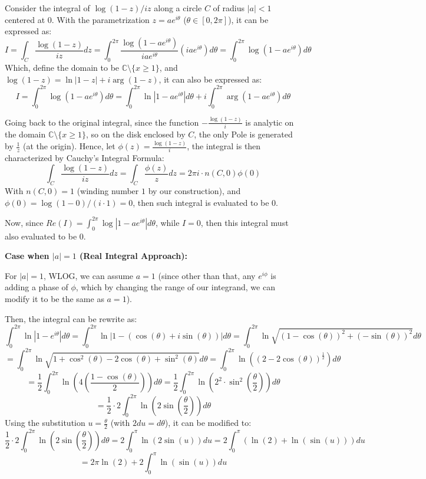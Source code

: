 \documentclass{article}
\begin{document}
\hfil

Consider the integral of $\log(1-z)/iz$ along a circle $C$ of radius $|a|<1$ centered at $0$. With the parametrization $z=ae^{i\theta}$ ($\theta\in [0,2\pi]$), it can be expressed as:
$$I=\int_{C}\frac{\log(1-z)}{iz}dz = \int_{0}^{2\pi}\frac{\log(1-ae^{i\theta})}{iae^{i\theta}}(iae^{i\theta})d\theta = \int_{0}^{2\pi}\log(1-ae^{i\theta})d\theta$$
Which, define the domain to be $\mathbb{C}\setminus\{x\geq 1\}$, and $\log(1-z)=\ln|1-z|+i\arg(1-z)$, it can also be expressed as:
$$I= \int_{0}^{2\pi}\log(1-ae^{i\theta})d\theta=\int_{0}^{2\pi}\ln|1-ae^{i\theta}|d\theta + i\int_{0}^{2\pi}\arg(1-ae^{i\theta})d\theta$$

Going back to the original integral, since the function $-\frac{\log(1-z)}{i}$ is analytic on the domain $\mathbb{C}\setminus\{x\geq 1\}$, so on the disk enclosed by $C$, the only Pole 
is generated by $\frac{1}{z}$ (at the origin). Hence, let $\phi(z)=\frac{\log(1-z)}{i}$, the integral is then characterized by Cauchy's Integral Formula:
$$\int_{C}\frac{\log(1-z)}{iz}dz = \int_{C}\frac{\phi(z)}{z}dz = 2\pi i\cdot n(C,0)\phi(0)$$
With $n(C,0)=1$ (winding number $1$ by our construction), and $\phi(0)=\log(1-0)/(i\cdot 1)=0$, then such integral is evaluated to be $0$.

Now, since $Re(I) = \int_{0}^{2\pi}\log|1-ae^{i\theta}|d\theta$, while $I=0$, then this integral must also evaluated to be $0$.

\hfil

\textbf{Case when $|a|=1$ (Real Integral Approach):}

For $|a|=1$, WLOG, we can assume $a=1$ (since other than that, any $e^{i\phi}$ is adding a phase of $\phi$, which by changing the range of our integrand, we can modify it to be the same as $a=1$).

Then, the integral can be rewrite as:
$$\int_{0}^{2\pi}\ln|1-e^{i\theta}|d\theta = \int_{0}^{2\pi}\ln|1-(\cos(\theta)+i\sin(\theta))|d\theta = \int_{0}^{2\pi}\ln\sqrt{(1-\cos(\theta))^2+(-\sin(\theta))^2}d\theta$$
$$=\int_{0}^{2\pi}\ln\sqrt{1+\cos^2(\theta)-2\cos(\theta)+\sin^2(\theta)}d\theta = \int_{0}^{2\pi}\ln\left((2-2\cos(\theta))^\frac{1}{2}\right)d\theta$$
$$=\frac{1}{2}\int_{0}^{2\pi}\ln\left(4\left(\frac{1-\cos(\theta)}{2}\right)\right)d\theta = \frac{1}{2}\int_{0}^{2\pi}\ln\left(2^2\cdot \sin^2\left(\frac{\theta}{2}\right)\right)d\theta$$
$$ = \frac{1}{2}\cdot 2\int_{0}^{2\pi}\ln\left(2\sin\left(\frac{\theta}{2}\right)\right)d\theta$$
Using the substitution $u=\frac{\theta}{2}$ (with $2du = d\theta$), it can be modified to:
$$\frac{1}{2}\cdot 2\int_{0}^{2\pi}\ln\left(2\sin\left(\frac{\theta}{2}\right)\right)d\theta = 2\int_{0}^{\pi}\ln(2\sin(u))du = 2\int_{0}^{\pi}(\ln(2)+\ln(\sin(u)))du$$
$$ = 2\pi\ln(2) + 2\int_{0}^{\pi}\ln(\sin(u))du$$
\end{document}
